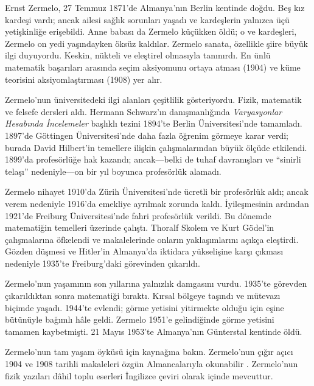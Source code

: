 




Ernst Zermelo, 27 Temmuz 1871'de Almanya'nın Berlin kentinde doğdu. Beş kız
kardeşi vardı; ancak ailesi sağlık sorunları yaşadı ve kardeşlerin yalnızca
üçü yetişkinliğe erişebildi. Anne babası da Zermelo küçükken öldü; o ve
kardeşleri, Zermelo on yedi yaşındayken öksüz kaldılar. Zermelo sanata,
özellikle şiire büyük ilgi duyuyordu. Keskin, nükteli ve eleştirel olmasıyla
tanınırdı. En ünlü matematik başarıları arasında seçim aksiyomunu ortaya
atması (1904) ve küme teorisini aksiyomlaştırması (1908) yer alır.

Zermelo'nun üniversitedeki ilgi alanları çeşitlilik gösteriyordu. Fizik,
matematik ve felsefe dersleri aldı. Hermann Schwarz'ın danışmanlığında
\emph{Varyasyonlar Hesabında İncelemeler} başlıklı tezini 1894'te Berlin
Üniversitesi'nde tamamladı. 1897'de G\"{o}ttingen Üniversitesi'nde daha fazla
öğrenim görmeye karar verdi; burada David Hilbert'in temellere ilişkin
çalışmalarından büyük ölçüde etkilendi. 1899'da profesörlüğe hak kazandı;
ancak---belki de tuhaf davranışları ve ``sinirli telaşı'' nedeniyle---on bir
yıl boyunca profesörlük alamadı.

Zermelo nihayet 1910'da Zürih Üniversitesi'nde ücretli bir profesörlük aldı;
ancak verem nedeniyle 1916'da emekliye ayrılmak zorunda kaldı. İyileşmesinin
ardından 1921'de Freiburg Üniversitesi'nde fahri profesörlük verildi. Bu
dönemde matematiğin temelleri üzerinde çalıştı. Thoralf Skolem ve Kurt
G\"{o}del'in çalışmalarına öfkelendi ve makalelerinde onların yaklaşımlarını
açıkça eleştirdi. Gözden düşmesi ve Hitler'in Almanya'da iktidara yükselişine
karşı çıkması nedeniyle 1935'te Freiburg'daki görevinden çıkarıldı.
 
Zermelo'nun yaşamının son yıllarına yalnızlık damgasını vurdu. 1935'te
görevden çıkarıldıktan sonra matematiği bıraktı. Kırsal bölgeye taşındı ve
mütevazı biçimde yaşadı. 1944'te evlendi; görme yetisini yitirmekte olduğu
için eşine bütünüyle bağımlı hâle geldi. Zermelo 1951'e gelindiğinde görme
yetisini tamamen kaybetmişti. 21 Mayıs 1953'te Almanya'nın G\"{u}nterstal
kentinde öldü.

\begin{reading}
Zermelo'nun tam yaşam öyküsü için \citet{Ebbinghaus2015} kaynağına bakın.
Zermelo'nun çığır açıcı 1904 ve 1908 tarihli makaleleri özgün Almancalarıyla
okunabilir \citep{Zermelo1904,Zermelo1908}. Zermelo'nun fizik yazıları dâhil
toplu eserleri İngilizce çeviri olarak \citep{Ebbinghaus2010,Ebbinghaus2013}
içinde mevcuttur.
\end{reading}

